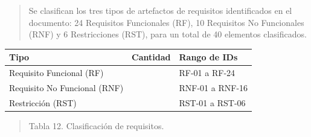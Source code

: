 \documentclass[
]{article}
\newcounter{none} %
\begin{document}
\begin{quote}
Se clasifican los tres tipos de artefactos de requisitos identificados
en el documento: 24 Requisitos Funcionales (RF), 10 Requisitos No
Funcionales (RNF) y 6 Restricciones (RST), para un total de 40 elementos
clasificados.
\end{quote}

{\def\LTcaptype{none} %
\begin{longtable}[]{@{}
  >{\centering\arraybackslash}p{}
  >{\centering\arraybackslash}p{}
  >{\centering\arraybackslash}p{}@{}}
\toprule\noalign{}
\begin{minipage}[b]{\linewidth}\centering
\textbf{Tipo}
\end{minipage} & \begin{minipage}[b]{\linewidth}\centering
\textbf{Cantidad}
\end{minipage} & \begin{minipage}[b]{\linewidth}\centering
\textbf{Rango de IDs}
\end{minipage} \\
\midrule\noalign{}
\endhead
\bottomrule\noalign{}
\endlastfoot
Requisito Funcional (RF) & 24 & RF-01 a RF-24 \\
Requisito No Funcional (RNF) & 16 & RNF-01 a RNF-16 \\
Restricción (RST) & 6 & RST-01 a RST-06 \\
\end{longtable}
}

\begin{quote}
\protect{}\label{_bookmark61}{}Tabla 12. Clasificación de
requisitos.
\end{quote}
\end{document}
